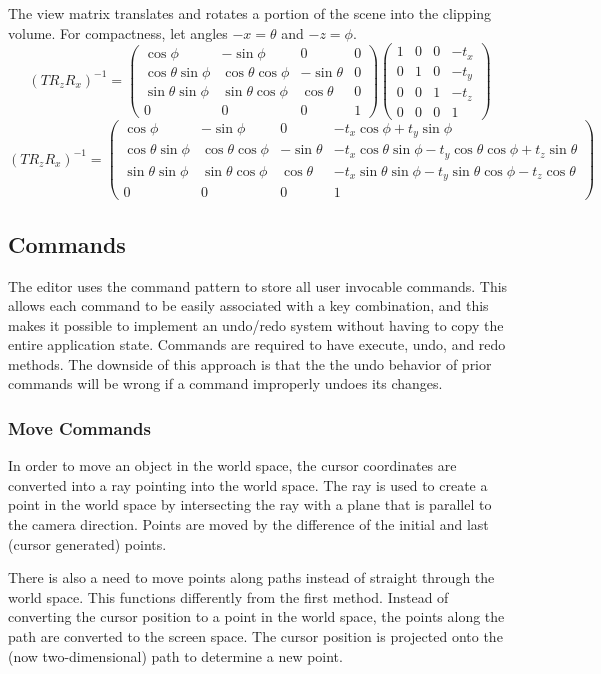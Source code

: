 \documentclass[10pt]{article}
\newcommand\m[1]{\begin{pmatrix}#1\end{pmatrix}}
\begin{document}
The view matrix translates and rotates a portion of the scene into the clipping volume. For compactness, let angles $ -x = \theta $ and $ -z = \phi $.
\[ (TR_zR_x)^{-1} = \m{
\cos\phi & -\sin\phi & 0 & 0 \\
\cos\theta \sin\phi & \cos\theta \cos\phi & -\sin\theta & 0 \\
\sin\theta \sin\phi & \sin\theta \cos\phi & \cos\theta & 0 \\
0 & 0 & 0 & 1} \m{
1 & 0 & 0 & -t_x \\
0 & 1 & 0 & -t_y \\
0 & 0 & 1 & -t_z \\
0 & 0 & 0 & 1} \]
\[ (TR_zR_x)^{-1} = \m{
\cos\phi & -\sin\phi & 0 & -t_x\cos\phi+t_y\sin\phi \\
\cos\theta \sin\phi & \cos\theta \cos\phi & -\sin\theta & -t_x\cos\theta\sin\phi-t_y\cos\theta\cos\phi+t_z\sin\theta \\
\sin\theta \sin\phi & \sin\theta \cos\phi & \cos\theta & -t_x\sin\theta\sin\phi-t_y\sin\theta\cos\phi-t_z\cos\theta \\
0 & 0 & 0 & 1} \]

\subsection{Commands}
The editor uses the command pattern to store all user invocable commands. This allows each command to be easily associated with a key combination, and this makes it possible to implement an undo/redo system without having to copy the entire application state. Commands are required to have execute, undo, and redo methods. The downside of this approach is that the the undo behavior of prior commands will be wrong if a command improperly undoes its changes.

\subsubsection{Move Commands}
In order to move an object in the world space, the cursor coordinates are converted into a ray pointing into the world space. The ray is used to create a point in the world space by intersecting the ray with a plane that is parallel to the camera direction. Points are moved by the difference of the initial and last (cursor generated) points.

There is also a need to move points along paths instead of straight through the world space. This functions differently from the first method. Instead of converting the cursor position to a point in the world space, the points along the path are converted to the screen space. The cursor position is projected onto the (now two-dimensional) path to determine a new point.
\end{document}
